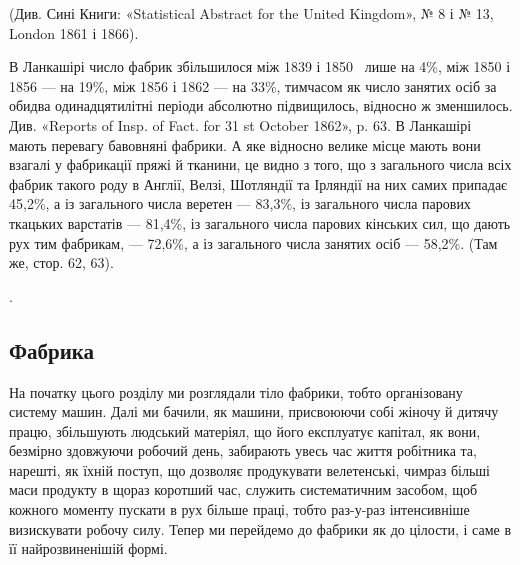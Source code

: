 {\begin{footnotesize}
\begin{tabularx}{\textwidth}{Xrrrr}
\end{tabularx}
\end{footnotesize}
\setlength{\tabcolsep}{\tabcolsepdef}

(Див. Сині Книги: «Statistical Abstract for the United Kingdom»,
№ 8 і № 13, London 1861 і 1866).

В Ланкашірі число фабрик збільшилося між 1839 і 1850~ лише на
4\%, між 1850 і 1856 — на 19\%, між 1856 і 1862 — на 33\%, тимчасом
як число занятих осіб за обидва одинадцятилітні періоди абсолютно підвищилось,
відносно ж зменшилось. Див. «Reports of Insp. of Fact. for
31 st October 1862», p. 63. В Ланкашірі мають перевагу бавовняні фабрики.
А яке відносно велике місце мають вони взагалі у фабрикації пряжі й
тканини, це видно з того, що з загального числа всіх фабрик такого роду
в Англії, Велзі, Шотляндії та Ірляндії на них самих припадає 45,2\%, а із
загального числа веретен — 83,3\%, із загального числа парових ткацьких
варстатів — 81,4\%, із загального числа парових кінських сил, що дають
рух тим фабрикам, — 72,6\%, а із загального числа занятих осіб — 58,2\%.
(Там же, стор. 62, 63).
}.

\subsection{Фабрика}

На початку цього розділу ми розглядали тіло фабрики, тобто
організовану систему машин. Далі ми бачили, як машини, присвоюючи
собі жіночу й дитячу працю, збільшують людський
матеріял, що його експлуатує капітал, як вони, безмірно здовжуючи
робочий день, забирають увесь час життя робітника та,
нарешті, як їхній поступ, що дозволяє продукувати велетенські,
чимраз більші маси продукту в щораз коротший час, служить
систематичним засобом, щоб кожного моменту пускати в рух
більше праці, тобто раз-у-раз інтенсивніше визискувати робочу
силу. Тепер ми перейдемо до фабрики як до цілости, і саме в її
найрозвиненішій формі.


